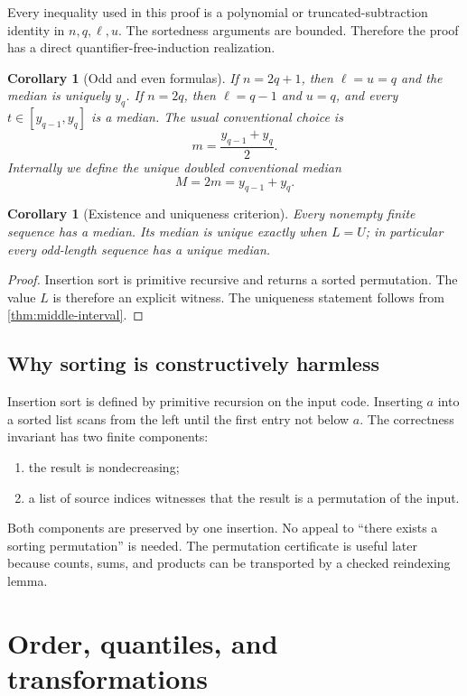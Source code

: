 \documentclass[11pt]{article}
\newtheorem{corollary}[theorem]{Corollary}
\begin{document}
Every inequality used in this proof is a polynomial or truncated-subtraction
identity in $n,q,\ell,u$.  The sortedness arguments are bounded.  Therefore
the proof has a direct quantifier-free-induction realization.

\begin{corollary}[Odd and even formulas]\label{cor:odd-even}
If $n=2q+1$, then $\ell=u=q$ and the median is uniquely $y_q$.  If $n=2q$,
then $\ell=q-1$ and $u=q$, and every $t\in[y_{q-1},y_q]$ is a median.  The
usual conventional choice is
\[
 m=\frac{y_{q-1}+y_q}{2}.
\]
Internally we define the unique doubled conventional median
\[
 M=2m=y_{q-1}+y_q.
\]
\end{corollary}

\begin{corollary}[Existence and uniqueness criterion]
Every nonempty finite sequence has a median.  Its median is unique exactly
when $L=U$; in particular every odd-length sequence has a unique median.
\end{corollary}

\begin{proof}
Insertion sort is primitive recursive and returns a sorted permutation.  The
value $L$ is therefore an explicit witness.  The uniqueness statement follows
from \cref{thm:middle-interval}.
\end{proof}

\subsection{Why sorting is constructively harmless}

Insertion sort is defined by primitive recursion on the input code.  Inserting
$a$ into a sorted list scans from the left until the first entry not below
$a$.  The correctness invariant has two finite components:

\begin{enumerate}
\item the result is nondecreasing;
\item a list of source indices witnesses that the result is a permutation of
the input.
\end{enumerate}

Both components are preserved by one insertion.  No appeal to ``there exists a
sorting permutation'' is needed.  The permutation certificate is useful later
because counts, sums, and products can be transported by a checked reindexing
lemma.

\section{Order, quantiles, and transformations}
\end{document}
